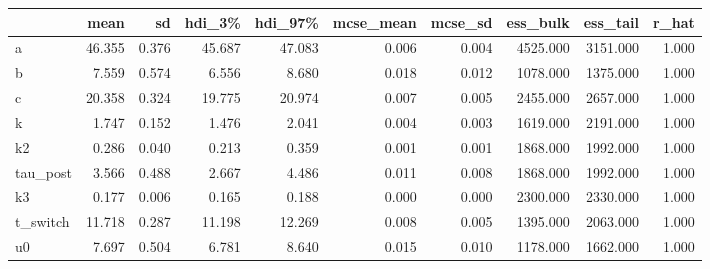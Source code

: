 \begin{tabular}{lrrrrrrrrr}
\toprule
 & mean & sd & hdi\_3\% & hdi\_97\% & mcse\_mean & mcse\_sd & ess\_bulk & ess\_tail & r\_hat \\
\midrule
a & 46.355 & 0.376 & 45.687 & 47.083 & 0.006 & 0.004 & 4525.000 & 3151.000 & 1.000 \\
b & 7.559 & 0.574 & 6.556 & 8.680 & 0.018 & 0.012 & 1078.000 & 1375.000 & 1.000 \\
c & 20.358 & 0.324 & 19.775 & 20.974 & 0.007 & 0.005 & 2455.000 & 2657.000 & 1.000 \\
k & 1.747 & 0.152 & 1.476 & 2.041 & 0.004 & 0.003 & 1619.000 & 2191.000 & 1.000 \\
k2 & 0.286 & 0.040 & 0.213 & 0.359 & 0.001 & 0.001 & 1868.000 & 1992.000 & 1.000 \\
tau\_post & 3.566 & 0.488 & 2.667 & 4.486 & 0.011 & 0.008 & 1868.000 & 1992.000 & 1.000 \\
k3 & 0.177 & 0.006 & 0.165 & 0.188 & 0.000 & 0.000 & 2300.000 & 2330.000 & 1.000 \\
t\_switch & 11.718 & 0.287 & 11.198 & 12.269 & 0.008 & 0.005 & 1395.000 & 2063.000 & 1.000 \\
u0 & 7.697 & 0.504 & 6.781 & 8.640 & 0.015 & 0.010 & 1178.000 & 1662.000 & 1.000 \\
\bottomrule
\end{tabular}
